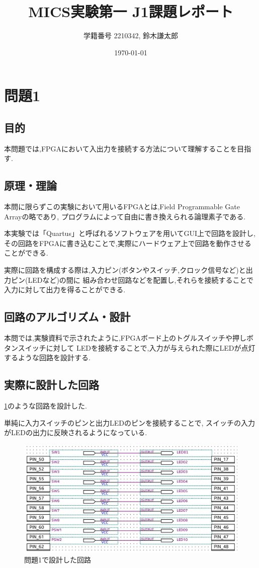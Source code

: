 \documentclass[autodetect-engine, dvi=dvipdfmx, 10pt, a4paper, ja=standard]{bxjsarticle}
\title{MICS実験第一 J1課題レポート}
\author{学籍番号 2210342, 鈴木謙太郎}
\date{\today}
\begin{document}
\maketitle



\section{問題1}

\subsection{目的}

本問題では,FPGAにおいて入出力を接続する方法について理解することを目指す.


\subsection{原理・理論}

本問に限らずこの実験において用いるFPGAとは,Field Programmable Gate Arrayの略であり,
プログラムによって自由に書き換えられる論理素子である.

本実験では「Quartus」と呼ばれるソフトウェアを用いてGUI上で回路を設計し,
その回路をFPGAに書き込むことで,実際にハードウェア上で回路を動作させることができる.

実際に回路を構成する際は,入力ピン(ボタンやスイッチ,クロック信号など)と出力ピン(LEDなど)の間に
組み合わせ回路などを配置し,それらを接続することで入力に対して出力を得ることができる.

\subsection{回路のアルゴリズム・設計}

本問では,実験資料で示されたように,FPGAボード上のトグルスイッチや押しボタンスイッチに対して
LEDを接続することで,入力が与えられた際にLEDが点灯するような回路を設計する.

\subsection{実際に設計した回路}

\ref{fig:ex1}のような回路を設計した.

単純に入力スイッチのピンと出力LEDのピンを接続することで,
スイッチの入力がLEDの出力に反映されるようになっている.


\begin{figure}[H]
	\centering
	\includegraphics[width=\textwidth]{asset/ex1-トリミング.jpg}
	\caption{問題1で設計した回路}
	\label{fig:ex1}
\end{figure}
\end{document}

